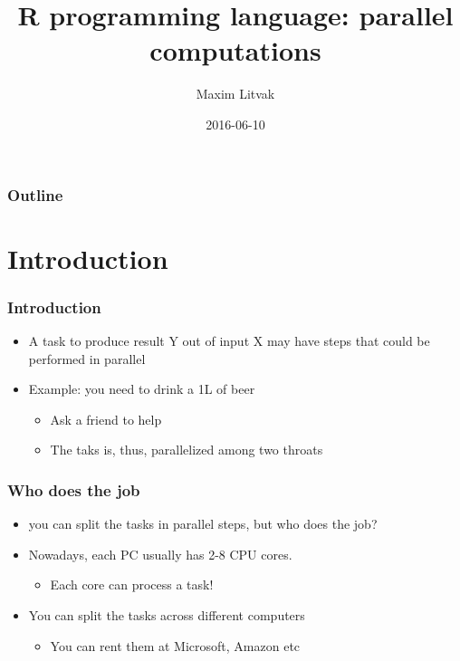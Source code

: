 \documentclass[bigger]{beamer}
\title{R programming language: parallel computations}
\author{Maxim Litvak}
\date{2016-06-10}
\begin{document}
\maketitle

\begin{frame}
\frametitle{Outline}
\setcounter{tocdepth}{3}
\tableofcontents
\end{frame}
\section{Introduction}
\label{sec-1}
\begin{frame}
\frametitle{Introduction}
\label{sec-1-1}
\begin{itemize}

\item A task to produce result Y out of input X may have steps that could be performed in parallel
\label{sec-1-1-1}%

\item Example: you need to drink a 1L of beer
\label{sec-1-1-2}%
\begin{itemize}

\item Ask a friend to help
\label{sec-1-1-2-1}%

\item The taks is, thus, parallelized among two throats
\label{sec-1-1-2-2}%
\end{itemize} %
\end{itemize} %
\end{frame}
\begin{frame}
\frametitle{Who does the job}
\label{sec-1-2}
\begin{itemize}

\item you can split the tasks in parallel steps, but who does the job?
\label{sec-1-2-1}%

\item Nowadays, each PC usually has 2-8 CPU cores.
\label{sec-1-2-2}%
\begin{itemize}

\item Each core can process a task!
\label{sec-1-2-2-1}%
\end{itemize} %

\item You can split the tasks across different computers
\label{sec-1-2-3}%
\begin{itemize}

\item You can rent them at Microsoft, Amazon etc
\label{sec-1-2-3-1}%
\end{itemize} %
\end{itemize} %
\end{frame}
\end{document}
